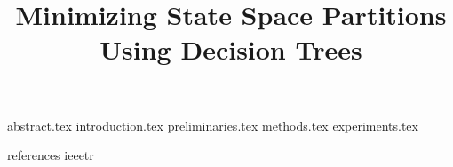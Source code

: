 \documentclass [
  10 pt,
  twocolumn,
  letterpaper
] {article}
\title {Minimizing State Space Partitions Using Decision Trees}
\author {%
  \authorblockN {Andreas Holck Høeg-Petersen}
  \authorblockA {Aalborg University\\ Denmark}
  \and
  \authorblockN {Kim Guldstrand Larsen}
  \authorblockA {Aalborg University\\ Denmark}
  \and
  \authorblockN {Peter Gjøl Jensen}
  \authorblockA {Aalborg University\\ Denmark}
  \and
  \authorblockN {Andrzej Wąsowski}
  \authorblockA {IT University of Copenhagen\\ Denmark}
}
\begin{document}
\maketitle

 {abstract.tex}
 {introduction.tex}
 {preliminaries.tex}
 {methods.tex}
 {experiments.tex}

\newpage

 {references}
 {ieeetr}


\end{document}
